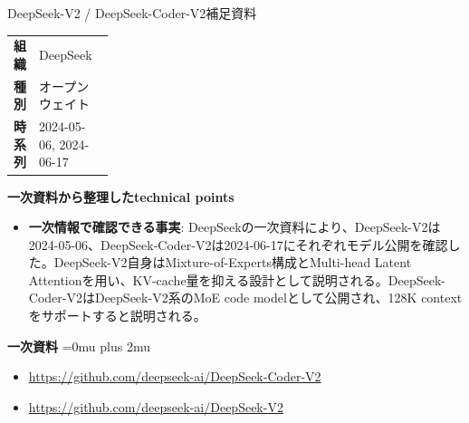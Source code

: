 \Needspace{0.38\textheight}
\begin{technicalnote}{DeepSeek-V2 / DeepSeek-Coder-V2}{補足資料}
\begingroup
\begin{tabularx}{\linewidth}{@{}>{\bfseries}p{0.22\linewidth}X@{}}
組織 & DeepSeek \\
種別 & オープンウェイト \\
時系列 & 2024-05-06, 2024-06-17 \\
\end{tabularx}
\smallskip
\begin{minipage}{\linewidth}
{\bfseries 一次資料から整理したtechnical points}
\begin{itemize}[leftmargin=1.5em,itemsep=0.35em]
\item \textbf{一次情報で確認できる事実}: DeepSeekの一次資料により、DeepSeek-V2は2024-05-06、DeepSeek-Coder-V2は2024-06-17にそれぞれモデル公開を確認した。DeepSeek-V2自身はMixture-of-Experts構成とMulti-head Latent Attentionを用い、KV-cache量を抑える設計として説明される。DeepSeek-Coder-V2はDeepSeek-V2系のMoE code modelとして公開され、128K contextをサポートすると説明される。
\end{itemize}
\begin{minipage}{\linewidth}
\begin{samepage}
{\bfseries 一次資料}
\begingroup\sloppy
\Urlmuskip=0mu plus 2mu\relax
\begin{itemize}[leftmargin=1.5em,itemsep=0.25em]
\item {\scriptsize\url{https://github.com/deepseek-ai/DeepSeek-Coder-V2}}
\item {\scriptsize\url{https://github.com/deepseek-ai/DeepSeek-V2}}
\end{itemize}
\endgroup
\end{samepage}
\end{minipage}
\end{minipage}
\endgroup
\end{technicalnote}
\medskip
